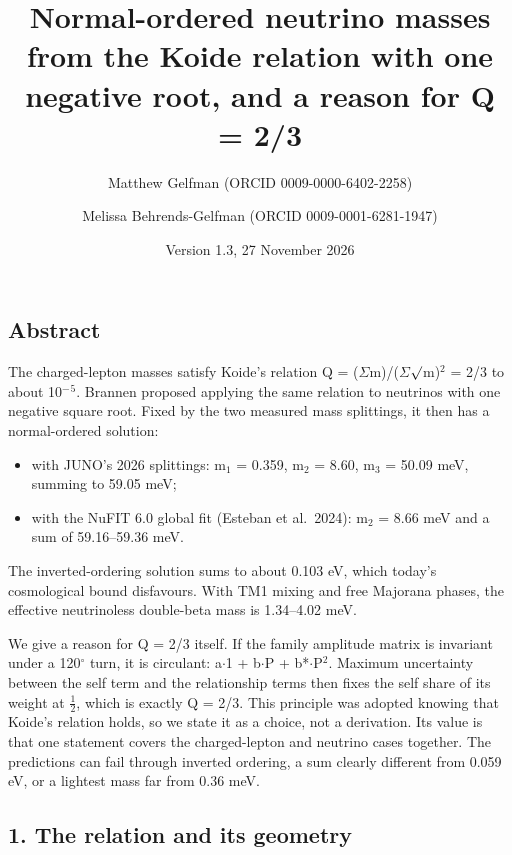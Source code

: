 \documentclass[
]{article}
\title{Normal-ordered neutrino masses from the Koide relation with one
negative root, and a reason for Q = 2/3}
\author{Matthew Gelfman (ORCID 0009-0000-6402-2258) \and Melissa
Behrends-Gelfman (ORCID 0009-0001-6281-1947)}
\date{Version 1.3, 27 November 2026}
\providecommand{\tightlist}{%
  \setlength{\itemsep}{0pt}\setlength{\parskip}{0pt}}
\begin{document}
\maketitle

\hypertarget{abstract}{%
\subsection{Abstract}\label{abstract}}

The charged-lepton masses satisfy Koide's relation Q = (\ensuremath{\Sigma}m)/(\ensuremath{\Sigma}\ensuremath{\surd}m)\ensuremath{^{2}} = 2/3
to about 10\ensuremath{^{-}}\ensuremath{^{5}}. Brannen proposed applying the same relation to neutrinos
with one negative square root. Fixed by the two measured mass
splittings, it then has a normal-ordered solution:

\begin{itemize}
\tightlist
\item
  with JUNO's 2026 splittings: m\ensuremath{_{1}} = 0.359, m\ensuremath{_{2}} = 8.60, m\ensuremath{_{3}} = 50.09 meV,
  summing to 59.05 meV;
\item
  with the NuFIT 6.0 global fit (Esteban et al.~2024): m\ensuremath{_{2}} = 8.66 meV and
  a sum of 59.16--59.36 meV.
\end{itemize}

The inverted-ordering solution sums to about 0.103 eV, which today's
cosmological bound disfavours. With TM1 mixing and free Majorana phases,
the effective neutrinoless double-beta mass is 1.34--4.02 meV.

We give a reason for Q = 2/3 itself. If the family amplitude matrix is
invariant under a 120\ensuremath{^{\circ}} turn, it is circulant: a\ensuremath{\cdot}1 + b\ensuremath{\cdot}P + b*\ensuremath{\cdot}P\ensuremath{^{2}}. Maximum
uncertainty between the self term and the relationship terms then fixes
the self share of its weight at \ensuremath{\tfrac12}, which is exactly Q = 2/3. This
principle was adopted knowing that Koide's relation holds, so we state
it as a choice, not a derivation. Its value is that one statement covers
the charged-lepton and neutrino cases together. The predictions can fail
through inverted ordering, a sum clearly different from 0.059 eV, or a
lightest mass far from 0.36 meV.

\hypertarget{the-relation-and-its-geometry}{%
\subsection{1. The relation and its
geometry}\label{the-relation-and-its-geometry}}
\end{document}

